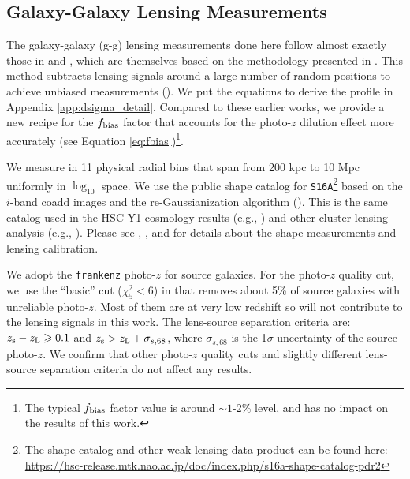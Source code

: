 \documentclass[fleqn,usenatbib,useAMS,english]{mnras}
\begin{document}
\subsection{Galaxy-Galaxy Lensing Measurements}
    \label{sec:dsigma}

    The galaxy-galaxy (g-g) lensing measurements done here follow almost exactly those in \citet{Speagle2019} and
    \citet{Huang2020}, which are themselves based on the methodology presented in \citet{Leauthaud2017}.
    This method subtracts lensing signals around a large number of random positions to achieve
    unbiased measurements (\citealt{Singh2017}).
    We put the equations to derive the \dsigma{} profile in Appendix \ref{app:dsigma_detail}.
    Compared to these earlier works, we provide a new recipe for the $f_{\rm bias}$ factor that
    accounts for the photo-$z$ dilution effect more accurately (see Equation
    \ref{eq:fbias})\footnote{ The typical $f_{\rm bias}$ factor value is around $\sim 1$-2\%
    level, and has no impact on the results of this work.}.

    We measure \dsigma{} in 11 physical radial bins that span from 200 kpc to 10 Mpc uniformly
    in $\log_{10}$ space.
    We use the public shape catalog for \texttt{S16A}\footnote{The shape catalog and other weak
    lensing data product can be found here:
    \href{here}{https://hsc-release.mtk.nao.ac.jp/doc/index.php/s16a-shape-catalog-pdr2}}
    based on the $i$-band coadd images and the re-Gaussianization algorithm
    (\citealt{HirataSeljak2003}).
    This is the same catalog used in the HSC Y1 cosmology results (e.g., \citealt{Hikage2019,
    Hamana2020}) and other cluster lensing analysis (e.g., \citealt{Umetsu2020}).
    Please see \citet{HSC-PIPE}, \citet{HSC-WLCAT}, and \citet{HSC-WLCALIB} for details about
    the shape measurements and lensing calibration.

    We adopt the \texttt{frankenz} photo-$z$ for source galaxies. 
    For the photo-$z$ quality cut, we use the ``basic'' cut ($\chi^{2}_{5} < 6$) in \citet{Speagle2019} 
    that removes about 5\% of source galaxies with unreliable photo-$z$.
    Most of them are at very low redshift so will not contribute to the lensing signals in this work.
    The lens-source separation criteria are: $z_{\rm s} - z_{\rm L} \ge 0.1$ and
    $z_{\rm s} > z_{\rm L} + \sigma_{s,68}$, where $\sigma_{s,68}$ is the 1$\sigma$ uncertainty
    of the source photo-$z$.
    We confirm that other photo-$z$ quality cuts and slightly different lens-source separation
    criteria do not affect any results.
\end{document}
